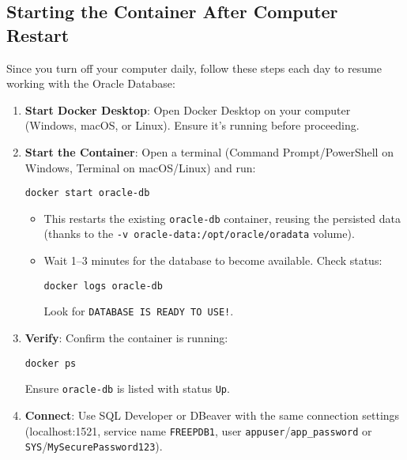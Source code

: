 \documentclass[a4paper,12pt]{article}
\begin{document}
\subsection{Starting the Container After Computer Restart}
Since you turn off your computer daily, follow these steps each day to resume working with the Oracle Database:
\begin{enumerate}
  \item \textbf{Start Docker Desktop}: Open Docker Desktop on your computer (Windows, macOS, or Linux). Ensure it’s running before proceeding.
  \item \textbf{Start the Container}: Open a terminal (Command Prompt/PowerShell on Windows, Terminal on macOS/Linux) and run:
    \begin{lstlisting}
docker start oracle-db
    \end{lstlisting}
    \begin{itemize}
      \item This restarts the existing \texttt{oracle-db} container, reusing the persisted data (thanks to the \texttt{-v oracle-data:/opt/oracle/oradata} volume).
      \item Wait 1--3 minutes for the database to become available. Check status:
        \begin{lstlisting}
docker logs oracle-db
        \end{lstlisting}
        Look for \texttt{DATABASE IS READY TO USE!}.
    \end{itemize}
  \item \textbf{Verify}: Confirm the container is running:
    \begin{lstlisting}
docker ps
    \end{lstlisting}
    Ensure \texttt{oracle-db} is listed with status \texttt{Up}.
  \item \textbf{Connect}: Use SQL Developer or DBeaver with the same connection settings (localhost:1521, service name \texttt{FREEPDB1}, user \texttt{appuser}/\texttt{app_password} or \texttt{SYS}/\texttt{MySecurePassword123}).
\end{enumerate}

\end{document}
